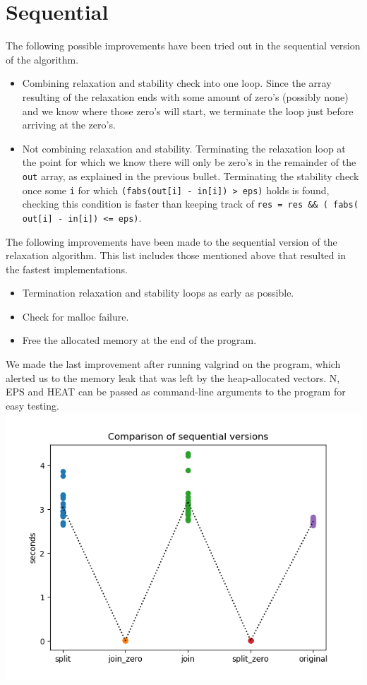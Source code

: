 \documentclass[a4paper]{article}
\begin{document}
\section{Sequential}
The following possible improvements have been tried out in the sequential version of the algorithm.
\begin{itemize}
    \item Combining relaxation and stability check into one loop. Since the array resulting of the relaxation ends with some amount of zero's (possibly none) and we know where those zero's will start, we terminate the loop just before arriving at the zero's.
    \item Not combining relaxation and stability. Terminating the relaxation loop at the point for which we know there will only be zero's in the remainder of the \texttt{out} array, as explained in the previous bullet. Terminating the stability check once some \texttt{i} for which \texttt{(fabs(out[i] - in[i]) > eps)} holds is found, checking this condition is faster than keeping track of \texttt{res = res \&\& ( fabs( out[i] - in[i]) <= eps)}.
\end{itemize}
The following improvements have been made to the sequential version of the relaxation algorithm. This list includes those mentioned above that resulted in the fastest implementations.
\begin{itemize}
    \item Termination relaxation and stability loops as early as possible.
    \item Check for malloc failure.
    \item Free the allocated memory at the end of the program.
\end{itemize}
We made the last improvement after running valgrind on the program, which alerted us to the memory leak that was left by the heap-allocated vectors.
N, EPS and HEAT can be passed as command-line arguments to the program for easy testing.\\
\includegraphics[scale = 0.5]{graphs/Comparison of sequential versions.png}
\end{document}
